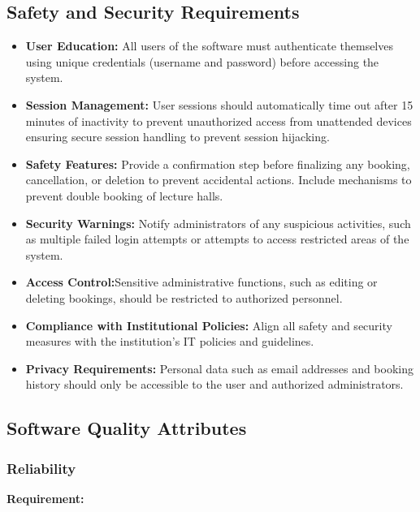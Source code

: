 \documentclass[a4paper,12pt]{article}
\begin{document}
\subsection{Safety and Security Requirements} \label{subsec:security_reqs}
\begin{itemize}
    \item \textbf{User Education:} All users of the software must authenticate themselves using unique credentials (username and password) before accessing the system.
    \item \textbf{Session Management:} User sessions should automatically time out after 15 minutes of inactivity to prevent unauthorized access from unattended devices ensuring secure session handling to prevent session hijacking.
    \item \textbf{Safety Features:} Provide a confirmation step before finalizing any booking, cancellation, or deletion to prevent accidental actions. Include mechanisms to prevent double booking of lecture halls.
    \item \textbf{Security Warnings:} Notify administrators of any suspicious activities, such as multiple failed login attempts or attempts to access restricted areas of the system.
    \item \textbf{Access Control:}Sensitive administrative functions, such as editing or deleting bookings, should be restricted to authorized personnel.
    \item \textbf{Compliance with Institutional Policies:}  Align all safety and security measures with the institution’s IT policies and guidelines.
    \item \textbf{Privacy Requirements:} Personal data such as email addresses and booking history should only be accessible to the user and authorized administrators.

\end{itemize}

\subsection{Software Quality Attributes} \label{subsec:software_quality_reqs}

\subsubsection{Reliability}

\hspace{5mm}

\textbf{Requirement:} 
\end{document}
